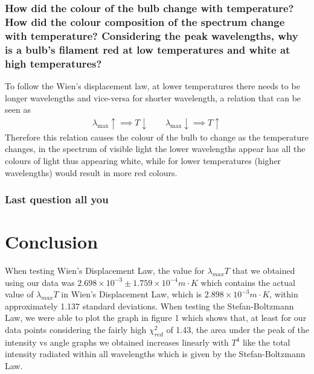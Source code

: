 \documentclass{article}
\begin{document}
\newpage
\subsubsection*{How did the colour of the bulb change with temperature? How did
the colour composition of the spectrum change with temperature? Considering the
peak wavelengths, why is a bulb's filament red at low temperatures and white at
high temperatures?}
To follow the Wien's displacement law, at lower temperatures there needs to be
longer wavelengths and vice-versa for shorter wavelength, a relation that can be
seen as 
\begin{align*}
    \lambda_{\max}\uparrow \implies T\downarrow \ \ \ \ \ \ \ \ \ 
    \lambda_{\max}\downarrow \implies T\uparrow
\end{align*}
Therefore this relation causes the colour of the bulb to change as the temperature
changes, in the spectrum of visible light the lower wavelengths appear has
all the colours of light thus appearing white, while for lower temperatures 
(higher wavelengths) would result in more red colours.

\subsubsection*{Last question all you}


\section{Conclusion}
When testing Wien's Displacement Law, the value for $\lambda_{max}T$ that we obtained 
using our data was $2.698 \times 10^{-3} \pm 1.759 \times 10^{-4} m\cdot K$ which contains 
the actual value of $\lambda_{max}T$ in Wien's Displacement Law, which is $2.898 \times 
10^{-3} m\cdot K$, within approximately 1.137 standard deviations.  When testing the 
Stefan-Boltzmann Law, we were able to plot the graph in figure 1 which shows that, at least 
for our data points considering the fairly high $\chi^2_{red}$ of 1.43, the area under 
the peak of the intensity vs angle graphs we obtained increases linearly with $T^4$ like 
the total intensity radiated within all wavelengths which is given by the Stefan-Boltzmann Law.
\end{document}
